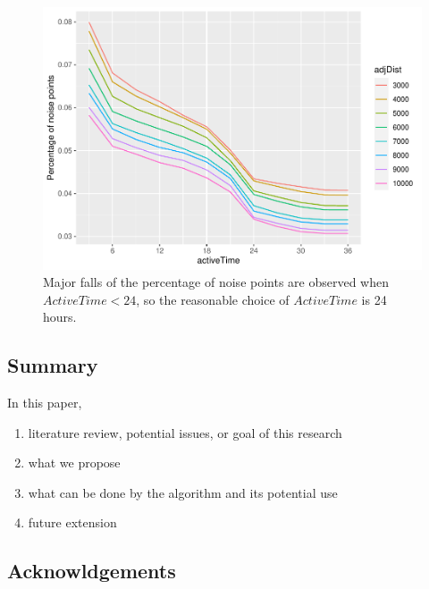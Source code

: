 \begin{Schunk}
\begin{figure}

{\centering \includegraphics[width=0.8\linewidth]{clustering_paper_files/figure-latex/vis2-1} 

}

\caption[Major falls of the percentage of noise points are observed when $ActiveTime < 24$, so the reasonable choice of $ActiveTime$ is 24 hours]{Major falls of the percentage of noise points are observed when $ActiveTime < 24$, so the reasonable choice of $ActiveTime$ is 24 hours.}\label{fig:vis2}
\end{figure}
\end{Schunk}

\hypertarget{summary}{%
\subsection{Summary}\label{summary}}

In this paper,

\begin{enumerate}
\def\labelenumi{\arabic{enumi}.}
\tightlist
\item
  literature review, potential issues, or goal of this research
\item
  what we propose
\item
  what can be done by the algorithm and its potential use
\item
  future extension
\end{enumerate}

\hypertarget{acknowldgements}{%
\subsection{Acknowldgements}\label{acknowldgements}}

